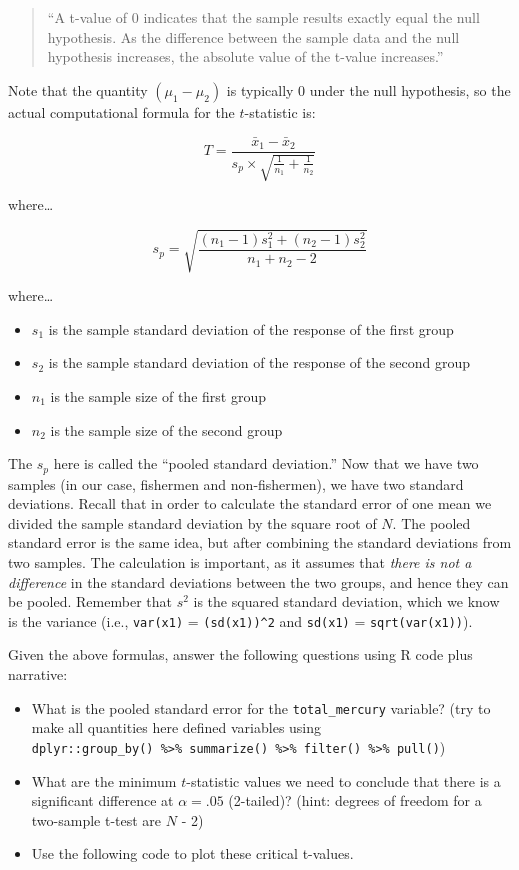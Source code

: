 \documentclass[]{article}
\providecommand{\tightlist}{%
  \setlength{\itemsep}{0pt}\setlength{\parskip}{0pt}}
\begin{document}
\begin{quote}
``A t-value of 0 indicates that the sample results exactly equal the
null hypothesis. As the difference between the sample data and the null
hypothesis increases, the absolute value of the t-value increases.''
\end{quote}

Note that the quantity \((\mu_1 - \mu_2)\) is typically 0 under the null
hypothesis, so the actual computational formula for the \(t\)-statistic
is:

\[{\displaystyle T={\frac {{\bar {x}}_{1}-{\bar {x}}_{2}}{s_{p}\times {\sqrt {{\frac {1}{n_{1}}}+{\frac {1}{n_{2}}}}}}}}\]

where\ldots{}

\[{\displaystyle s_{p}=
{\sqrt {\frac {\left(n_{1}-1\right)s_{1}^{2}+\left(n_{2}-1\right)s_{2}^{2}}{n_{1}+n_{2}-2}}}}\]

where\ldots{}

\begin{itemize}
\tightlist
\item
  \(s_1\) is the sample standard deviation of the response of the first
  group
\item
  \(s_2\) is the sample standard deviation of the response of the second
  group
\item
  \(n_1\) is the sample size of the first group
\item
  \(n_2\) is the sample size of the second group
\end{itemize}

The \(s_p\) here is called the ``pooled standard deviation.'' Now that
we have two samples (in our case, fishermen and non-fishermen), we have
two standard deviations. Recall that in order to calculate the standard
error of one mean we divided the sample standard deviation by the square
root of \(N\). The pooled standard error is the same idea, but after
combining the standard deviations from two samples. The calculation is
important, as it assumes that \emph{there is not a difference} in the
standard deviations between the two groups, and hence they can be
pooled. Remember that \(s^2\) is the squared standard deviation, which
we know is the variance (i.e., \texttt{var(x1)} = \texttt{(sd(x1))\^{}2}
and \texttt{sd(x1)} = \texttt{sqrt(var(x1))}).

Given the above formulas, answer the following questions using R code
plus narrative:

\begin{itemize}
\item
  What is the pooled standard error for the \texttt{total\_mercury}
  variable? (try to make all quantities here defined variables using
  \texttt{dplyr::group\_by()\ \%\textgreater{}\%\ summarize()\ \%\textgreater{}\%\ filter()\ \%\textgreater{}\%\ pull()})
\item
  What are the minimum \(t\)-statistic values we need to conclude that
  there is a significant difference at \(\alpha = .05\) (2-tailed)?
  (hint: degrees of freedom for a two-sample t-test are \(N\) - 2)
\item
  Use the following code to plot these critical t-values.
\end{itemize}
\end{document}
